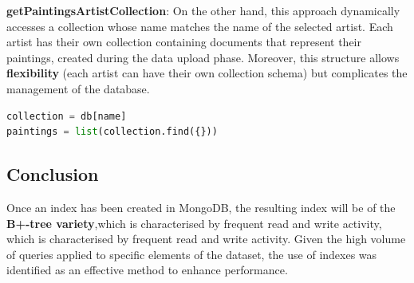 \documentclass[a4paper,12pt]{article}
\begin{document}
\textbf{getPaintingsArtistCollection}: On the other hand, this approach dynamically accesses a collection whose name matches the name of the selected artist. Each artist has their own collection containing documents that represent their paintings, created during the data upload phase. Moreover, this structure allows \textbf{flexibility} (each artist can have their own collection schema) but complicates the management of the database.
\begin{lstlisting}[language=Python]
collection = db[name]
paintings = list(collection.find({}))
\end{lstlisting}

\subsection{Conclusion}

Once an index has been created in MongoDB, the resulting index will be of the \textbf{B+-tree variety},which is characterised by frequent read and write activity, which is characterised by frequent read and write activity.
Given the high volume of queries applied to specific elements of the dataset, the use of indexes was identified as an effective method to enhance performance.
\end{document}

